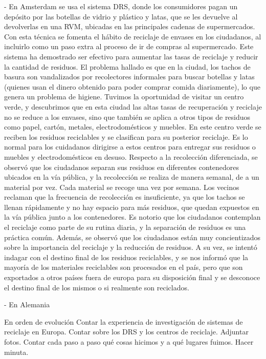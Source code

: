 - En Amsterdam se usa el sistema DRS, donde los consumidores pagan un depósito por las botellas de vidrio y plástico y latas, que se les devuelve al devolverlas en una RVM, ubicadas en las principales cadenas de supermercados. Con esta técnica se fomenta el hábito de reciclaje de envases en los ciudadanos, al incluirlo como un paso extra al proceso de ir de compras al supermercado. Este sistema ha demostrado ser efectivo para aumentar las tasas de reciclaje y reducir la cantidad de residuos. El problema hallado es que en la ciudad, los tachos de basura son vandalizados por recolectores informales para buscar botellas y latas (quienes usan el dinero obtenido para poder comprar comida diariamente), lo que genera un problema de higiene. Tuvimos la oportunidad de visitar un centro verde, y descubrimos que en esta ciudad las altas tasas de recuperación y reciclaje no se reduce a los envases, sino que también se aplica a otros tipos de residuos como papel, cartón, metales, electrodomésticos y muebles. En este centro verde se reciben los residuos reciclables y se clasifican para su posterior reciclaje. Es lo normal para los cuidadanos dirigirse a estos centros para entregar sus residuos o muebles y electrodomésticos en desuso. Respecto a la recolección diferenciada, se observó que los ciudadanos separan sus residuos en diferentes contenedores ubicados en la vía pública, y la recolección se realiza de manera semanal, de a un material por vez. Cada material se recoge una vez por semana. Los vecinos reclaman que la frecuencia de recolección es insuficiente, ya que los tachos se llenan rápidamente y no hay espacio para más residuos, que quedan expuestos en la vía pública junto a los contenedores. Es notorio que los ciudadanos contemplan el reciclaje como parte de su rutina diaria, y la separación de residuos es una práctica común. Además, se observó que los ciudadanos están muy concientizados sobre la importancia del reciclaje y la reducción de residuos. A su vez, se intentó indagar con el destino final de los residuos reciclables, y se nos informó que la mayoría de los materiales reciclables son procesados en el país, pero que son exportados a otros países fuera de europa para su disposición final y se desconoce el destino final de los mismos o si realmente son reciclados.

- En Alemania


En orden de evolución 
Contar la experiencia de investigación de sistemas de reciclaje en Europa. Contar sobre los DRS y los centros de reciclaje. Adjuntar fotos. Contar cada paso a paso qué cosas hicimos y a qué lugares fuimos. Hacer minuta.
